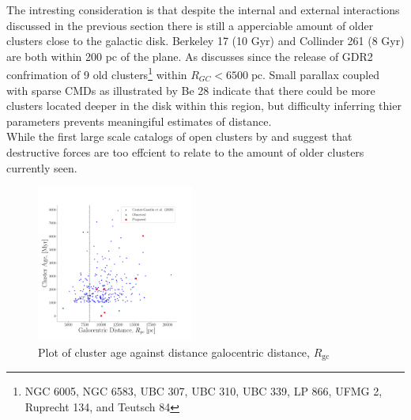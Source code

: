 The intresting consideration is that despite the internal and external interactions discussed in the previous section there is still a apperciable amount of older clusters close to the galactic disk. Berkeley 17 (10 Gyr) and Collinder 261 (8 Gyr) are both within 200 pc of the plane. As \cite{2020A&A...640A...1C} discusses since the release of GDR2 confrimation of 9 old clusters\footnote{NGC 6005, NGC 6583, UBC 307, UBC 310, UBC 339, LP 866, UFMG 2, Ruprecht 134, and Teutsch 84} within $R_{GC}< 6500 \; \text{pc}$. 
Small parallax coupled with sparse CMDs as illustrated by Be 28 indicate that there could be more clusters located deeper in the disk within this region, but difficulty inferring thier parameters prevents meaningiful estimates of distance.  \\ While the first large scale catalogs of open clusters by \cite{lynga1982open} and \cite{dias2002new} suggest that destructive forces are too effcient to relate to the amount of older clusters currently seen. 

\begin{figure}[ht!]
  \centering
  \includegraphics[width = 0.46\textwidth]{figures/agevsrgc.pdf}
  \caption{Plot of cluster age against distance galocentric distance, $R_{\text{gc}}$}
  \label{fig:agevsrgc}
\end{figure}

